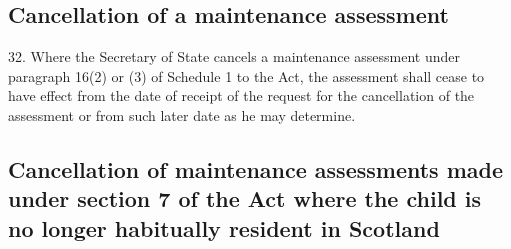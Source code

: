 \documentclass[a4paper,12pt]{article}
\begin{document}
%
%
%
%

\subsection[32. Cancellation of a maintenance assessment]{Cancellation of a maintenance assessment}

32.  Where 
the Secretary of State  %
cancels a maintenance assessment under paragraph 16(2) or (3) of Schedule 1 to the Act, the assessment shall cease to have effect from the date of receipt of the request for the cancellation of the assessment or from such later date as 
he  %
may determine.


\subsection[32A. Cancellation of maintenance assessments made under section 7 of the Act where the child is no longer habitually resident in Scotland]{Cancellation of maintenance assessments made under section 7 of the Act where the child is no longer habitually resident in Scotland}
\end{document}
